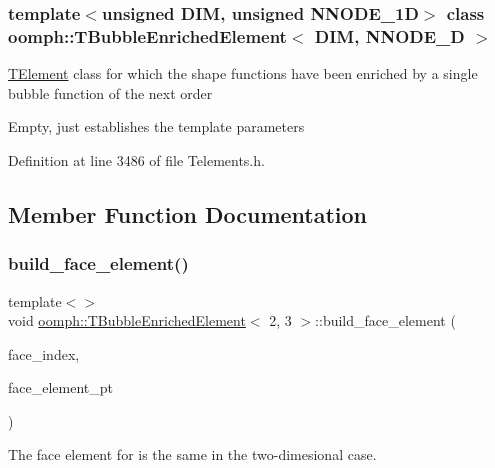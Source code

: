 \subsubsection*{template$<$unsigned D\+IM, unsigned N\+N\+O\+D\+E\+\_\+1D$>$\newline
class oomph\+::\+T\+Bubble\+Enriched\+Element$<$ D\+I\+M, N\+N\+O\+D\+E\+\_\+D $>$}

\hyperlink{classoomph_1_1TElement}{T\+Element} class for which the shape functions have been enriched by a single bubble function of the next order

Empty, just establishes the template parameters 

Definition at line 3486 of file Telements.\+h.



\subsection{Member Function Documentation}
\mbox{\label{classoomph_1_1TBubbleEnrichedElement_aeccf2f175fd1499a4463063b4cf50cd2}} 
\subsubsection{\texorpdfstring{build\+\_\+face\+\_\+element()}{build\_face\_element()}\hspace{0.1cm}{\footnotesize\ttfamily [1/2]}}
{\footnotesize\ttfamily template$<$$>$ \\
void \hyperlink{classoomph_1_1TBubbleEnrichedElement}{oomph\+::\+T\+Bubble\+Enriched\+Element}$<$ 2, 3 $>$\+::build\+\_\+face\+\_\+element (\begin{DoxyParamCaption}\item[{const int \&}]{face\+\_\+index,  }\item[{\hyperlink{classoomph_1_1FaceElement}{Face\+Element} $\ast$}]{face\+\_\+element\+\_\+pt }\end{DoxyParamCaption})}



The face element for is the same in the two-\/dimesional case. 



